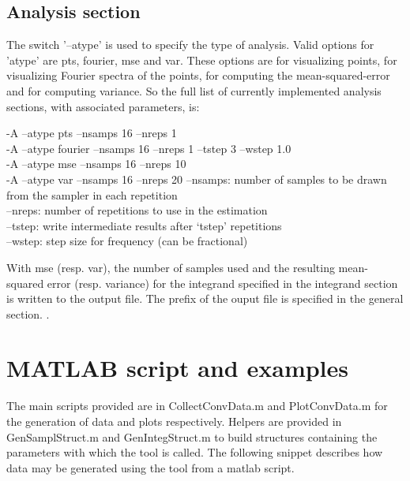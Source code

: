 \subsection{Analysis section}
The switch '--atype' is used to specify the type of analysis. Valid options for 'atype' are pts, fourier, mse and var. These options are for visualizing points, for visualizing Fourier spectra of the points, for computing the mean-squared-error and for computing variance. So the full list of currently implemented analysis sections, with associated parameters, is:
\begin{tcolorbox}
  -A --atype pts --nsamps 16 --nreps 1 \\
  -A --atype fourier --nsamps 16 --nreps 1 --tstep 3 --wstep 1.0 \\
  -A --atype mse --nsamps 16 --nreps 10 \\
  -A --atype var --nsamps 16 --nreps 20 
  \tcblower
    --nsamps: number of samples to be drawn from the sampler in each repetition \\
    --nreps: number of repetitions to use in the estimation \\
    --tstep: write intermediate results after `tstep' repetitions \\
    --wstep: step size for frequency (can be fractional) 
\end{tcolorbox}
With mse (resp. var), the number of samples used and the resulting mean-squared error (resp. variance) for the integrand specified in the integrand section is written to the output file. The prefix of the ouput file is specified in the general section.
.

\section{MATLAB script and examples}
The main scripts provided are in CollectConvData.m and PlotConvData.m for the generation of data and plots respectively. Helpers are provided in GenSamplStruct.m  and GenIntegStruct.m to build structures containing the parameters with which the tool is called. The following snippet describes how data may be generated using the tool from a matlab script. 
